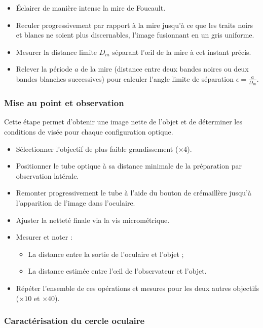 \begin{itemize}
    \item Éclairer de manière intense la mire de Foucault.
    \item Reculer progressivement par rapport à la mire jusqu'à ce que les traits noirs et blancs ne soient plus discernables, l'image fusionnant en un gris uniforme.
    \item Mesurer la distance limite $D_m$ séparant l'œil de la mire à cet instant précis.
    \item Relever la période $a$ de la mire (distance entre deux bandes noires ou deux bandes blanches successives) pour calculer l'angle limite de séparation $\epsilon = \frac{a}{D_m}$.
\end{itemize}

\subsubsection{Mise au point et observation}

Cette étape permet d'obtenir une image nette de l'objet et de déterminer les conditions de visée pour chaque configuration optique.

\begin{itemize}
    \item Sélectionner l'objectif de plus faible grandissement ($\times 4$).
    \item Positionner le tube optique à sa distance minimale de la préparation par observation latérale.
    \item Remonter progressivement le tube à l'aide du bouton de crémaillère jusqu'à l'apparition de l'image dans l'oculaire.
    \item Ajuster la netteté finale via la vis micrométrique.
    \item Mesurer et noter :
    \begin{itemize}
        \item La distance entre la sortie de l'oculaire et l'objet ;
        \item La distance estimée entre l'œil de l'observateur et l'objet.
    \end{itemize}
    \item Répéter l'ensemble de ces opérations et mesures pour les deux autres objectifs ($\times 10$ et $\times 40$).
\end{itemize}

\subsubsection{Caractérisation du cercle oculaire}

